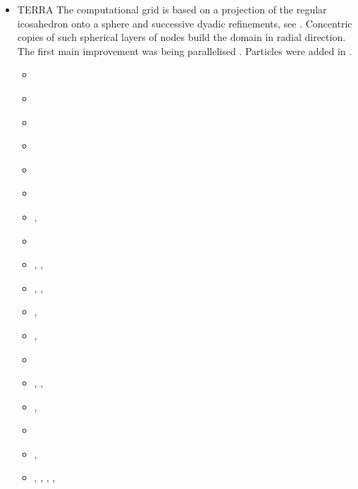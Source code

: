 \begin{itemize}
\item {\codefont TERRA} 
The computational grid is based on a projection of the regular icosahedron onto a 
sphere and successive dyadic refinements, see \textcite{bafr85}.  Concentric copies of such  
spherical layers of nodes build the domain in radial direction.
The first main improvement was being parallelised \textcite{buba95}.
Particles were added in \textcite{strb02}.

\begin{scriptsize}
\begin{itemize}
\item[\nineteeneightythree]  \textcite{baum83}
\item[\nineteeneightyeight]  \textcite{glat88}
\item[\nineteenninetythree]  \textcite{tasg93}
\item[\nineteenninetyfour]   \textcite{tasg94}
\item[\nineteenninetyfive]   \textcite{buba95}
\item[\nineteenninetysix]    \textcite{buri96}
\item[\nineteenninetyseven]  \textcite{burb97},  \textcite{yang97}
\item[\nineteenninetyeight]  \textcite{burl98}
\item[\nineteenninetynine]   \textcite{tabg99},  \textcite{ribr99}, \textcite{resb99}
\item[\twothousandone]       \textcite{buda01},  \textcite{burm01}, \textcite{dabu01}
\item[\twothousandtwo]       \textcite{burb02},  \textcite{strb02}
\item[\twothousandthree]     \textcite{buht03},  \textcite{stjz03}
\item[\twothousandfour]      \textcite{resb04}
\item[\twothousandfive]      \textcite{resb05},  \textcite{phbu05},  \textcite{funk05}
\item[\twothousandsix]       \textcite{dabu06},  \textcite{gowh06}
\item[\twothousandseven]     \textcite{phbu07}
\item[\twothousandeight]     \textcite{heib08},  \textcite{shlj08}
\item[\twothousandnine]      \textcite{phbs09},  \textcite{wodd09},
                             \textcite{gows09},  \textcite{iabu09},

\end{itemize}
\end{scriptsize}
\end{itemize}

